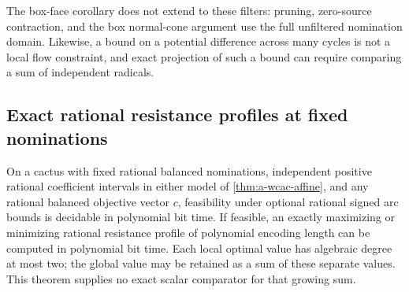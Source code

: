 The box-face corollary does not extend to these filters: pruning,
zero-source contraction, and the box normal-cone argument use the full
unfiltered nomination domain. Likewise, a bound on a potential difference
across many cycles is not a local flow constraint, and exact projection of
such a bound can require comparing a sum of independent radicals.

\subsection{Exact rational resistance profiles at fixed nominations}

\begin{theorem}
\label{thm:a-wcac-exact-profile}
On a cactus with fixed rational balanced nominations, independent
positive rational coefficient intervals in either model of
\cref{thm:a-wcac-affine}, and any rational
balanced objective vector $c$, feasibility under optional rational signed
arc bounds is decidable in polynomial bit time. If feasible, an exactly
maximizing or minimizing rational resistance profile of polynomial
encoding length can be computed in polynomial bit time. Each local
optimal value has algebraic degree at most two; the global value may be
retained as a sum of these separate values. This theorem supplies no
exact scalar comparator for that growing sum.
\end{theorem}
